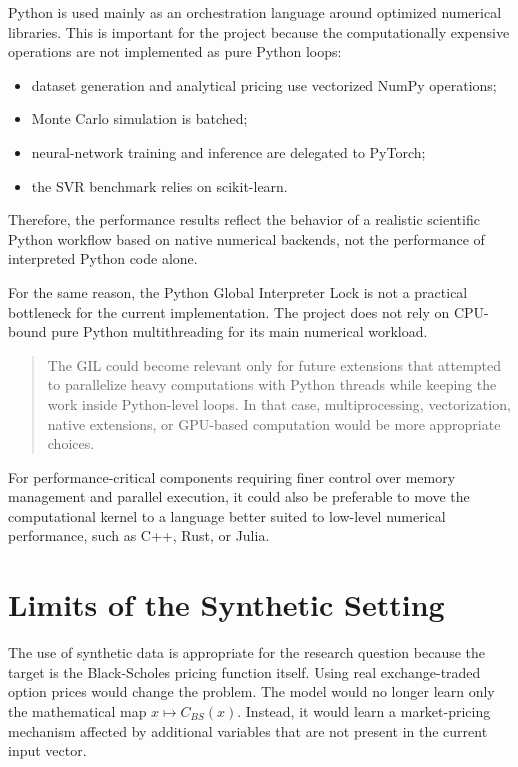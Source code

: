 Python is used mainly as an orchestration language around optimized numerical libraries.
This is important for the project because the computationally expensive operations are not implemented as pure Python loops:

\begin{itemize}
    \item dataset generation and analytical pricing use vectorized NumPy operations;
    \item Monte Carlo simulation is batched;
    \item neural-network training and inference are delegated to PyTorch;
    \item the SVR benchmark relies on scikit-learn.
\end{itemize}
Therefore, the performance results reflect the behavior of a realistic scientific Python workflow based on native numerical backends, not the performance of interpreted Python code alone.

For the same reason, the Python Global Interpreter Lock is not a practical bottleneck for the current implementation.
The project does not rely on CPU-bound pure Python multithreading for its main numerical workload.
\begin{quote}
The GIL could become relevant only for future extensions that attempted to parallelize heavy computations with Python threads while keeping the work inside Python-level loops.
In that case, multiprocessing, vectorization, native extensions, or GPU-based computation would be more appropriate choices.
\end{quote}

For performance-critical components requiring finer control over memory management and parallel execution, it could also be preferable to move the computational kernel to a language better suited to low-level numerical performance, such as C++, Rust, or Julia.

\section{Limits of the Synthetic Setting}

The use of synthetic data is appropriate for the research question because the target is the Black-Scholes pricing function itself.
Using real exchange-traded option prices would change the problem.
The model would no longer learn only the mathematical map $x \mapsto C_{BS}(x)$.
Instead, it would learn a market-pricing mechanism affected by additional variables that are not present in the current input vector.

